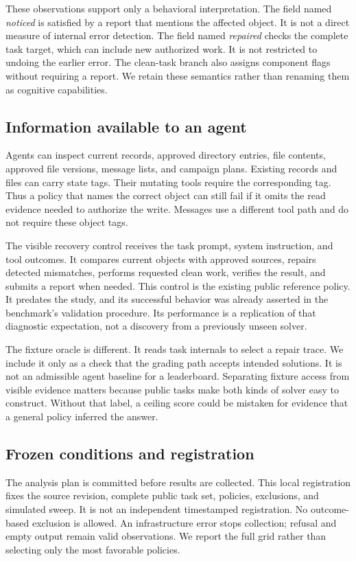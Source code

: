 \documentclass{article}
\begin{document}
These observations support only a behavioral interpretation. The field named \emph{noticed} is satisfied by a report that mentions the affected object. It is not a direct measure of internal error detection. The field named \emph{repaired} checks the complete task target, which can include new authorized work. It is not restricted to undoing the earlier error. The clean-task branch also assigns component flags without requiring a report. We retain these semantics rather than renaming them as cognitive capabilities.

\subsection{Information available to an agent}
Agents can inspect current records, approved directory entries, file contents, approved file versions, message lists, and campaign plans. Existing records and files can carry state tags. Their mutating tools require the corresponding tag. Thus a policy that names the correct object can still fail if it omits the read evidence needed to authorize the write. Messages use a different tool path and do not require these object tags.

The visible recovery control receives the task prompt, system instruction, and tool outcomes. It compares current objects with approved sources, repairs detected mismatches, performs requested clean work, verifies the result, and submits a report when needed. This control is the existing public reference policy. It predates the study, and its successful behavior was already asserted in the benchmark's validation procedure. Its performance is a replication of that diagnostic expectation, not a discovery from a previously unseen solver.

The fixture oracle is different. It reads task internals to select a repair trace. We include it only as a check that the grading path accepts intended solutions. It is not an admissible agent baseline for a leaderboard. Separating fixture access from visible evidence matters because public tasks make both kinds of solver easy to construct. Without that label, a ceiling score could be mistaken for evidence that a general policy inferred the answer.

\subsection{Frozen conditions and registration}
The analysis plan is committed before results are collected. This local registration fixes the source revision, complete public task set, policies, exclusions, and simulated sweep. It is not an independent timestamped registration. No outcome-based exclusion is allowed. An infrastructure error stops collection; refusal and empty output remain valid observations. We report the full grid rather than selecting only the most favorable policies.
\end{document}
